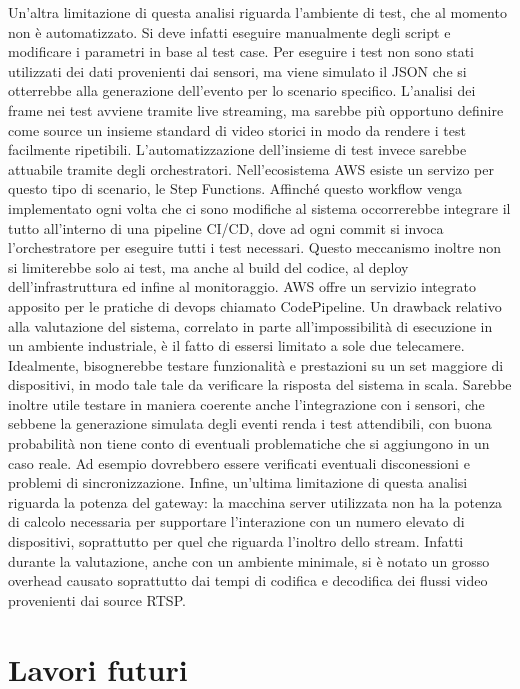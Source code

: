 Un'altra limitazione di questa analisi riguarda l'ambiente di test, che al momento non è automatizzato. Si deve infatti eseguire manualmente degli script e modificare i parametri in base al test case. Per eseguire i test non sono stati utilizzati dei dati provenienti dai sensori, ma viene simulato il JSON che si otterrebbe alla generazione dell'evento per lo scenario specifico. L'analisi dei frame nei test avviene tramite live streaming, ma sarebbe più opportuno definire come source un insieme standard di video storici in modo da rendere i test facilmente ripetibili. L'automatizzazione dell'insieme di test invece sarebbe attuabile tramite degli orchestratori. Nell'ecosistema AWS esiste un servizo per questo tipo di scenario, le Step Functions. Affinché questo workflow venga implementato ogni volta che ci sono modifiche al sistema occorrerebbe integrare il tutto all'interno di una pipeline CI/CD, dove ad ogni commit si invoca l'orchestratore per eseguire tutti i test necessari. Questo meccanismo inoltre non si limiterebbe solo ai test, ma anche al build del codice, al deploy dell'infrastruttura ed infine al monitoraggio. AWS offre un servizio integrato apposito per le pratiche di devops chiamato CodePipeline. Un drawback relativo alla valutazione del sistema, correlato in parte all'impossibilità di esecuzione in un ambiente industriale, è il fatto di essersi limitato a sole due telecamere. Idealmente, bisognerebbe testare funzionalità e prestazioni su un set maggiore di dispositivi, in modo tale tale da verificare la risposta del sistema in scala. Sarebbe inoltre utile testare in maniera coerente anche l'integrazione con i sensori, che sebbene la generazione simulata degli eventi renda i test attendibili, con buona probabilità non tiene conto di eventuali problematiche che si aggiungono in un caso reale. Ad esempio dovrebbero essere verificati eventuali disconessioni e problemi di sincronizzazione. 
Infine, un'ultima limitazione di questa analisi riguarda la potenza del gateway: la macchina server utilizzata non ha la potenza di calcolo necessaria per supportare l'interazione con un numero elevato di dispositivi, soprattutto per quel che riguarda l'inoltro dello stream. Infatti durante la valutazione, anche con un ambiente minimale, si è notato un grosso overhead causato soprattutto dai tempi di codifica e decodifica dei flussi video provenienti dai source RTSP.  

\section{Lavori futuri}

